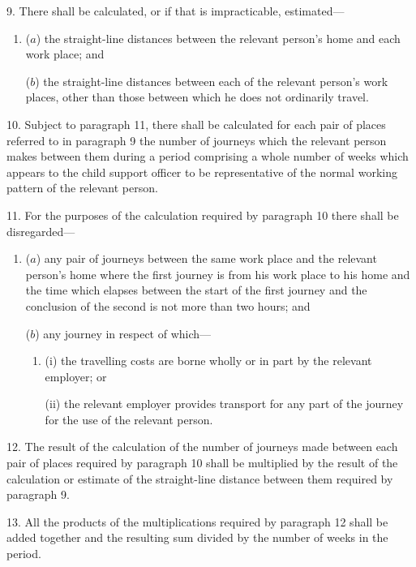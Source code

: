 \documentclass[a4paper]{article}
\begin{document}
\medskip

9.  There shall be calculated, or if that is impracticable, estimated—
\begin{enumerate}\item[]
($a$) the straight-line distances between the relevant person’s home and each work place; and

($b$) the straight-line distances between each of the relevant person’s work places, other than those between which he does not ordinarily travel.
\end{enumerate}

\medskip

10.  Subject to paragraph 11, there shall be calculated for each pair of places referred to in paragraph 9 the number of journeys which the relevant person makes between them during a period comprising a whole number of weeks which appears to the child support officer to be representative of the normal working pattern of the relevant person.

\medskip

11.  For the purposes of the calculation required by paragraph 10 there shall be disregarded—
\begin{enumerate}\item[]
($a$) any pair of journeys between the same work place and the relevant person’s home where the first journey is from his work place to his home and the time which elapses between the start of the first journey and the conclusion of the second is not more than two hours; and

($b$) any journey in respect of which—
\begin{enumerate}\item[]
(i) the travelling costs are borne wholly or in part by the relevant employer; or

(ii) the relevant employer provides transport for any part of the journey for the use of the relevant person.
\end{enumerate}
\end{enumerate}

\medskip

12.  The result of the calculation of the number of journeys made between each pair of places required by paragraph 10 shall be multiplied by the result of the calculation or estimate of the straight-line distance between them required by paragraph 9.

\medskip

13.  All the products of the multiplications required by paragraph 12 shall be added together and the resulting sum divided by the number of weeks in the period.
\end{document}
